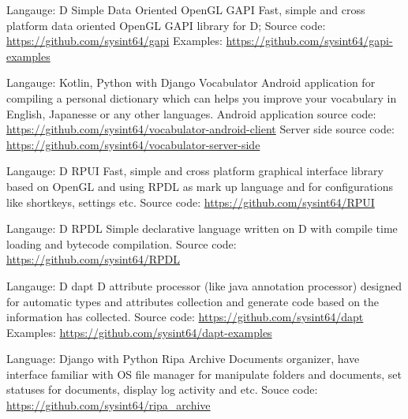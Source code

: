 \begin{cventries}


\cventry
{Langauge: D}
{Simple Data Oriented OpenGL GAPI}
{}
{}
{
Fast, simple and cross platform data oriented OpenGL GAPI library for D;\linebreak
Source code: \url{https://github.com/sysint64/gapi}\linebreak
Examples: \url{https://github.com/sysint64/gapi-examples}\linebreak
}

\cventry
{Langauge: Kotlin, Python with Django}
{Vocabulator}
{}
{}
{
Android application for compiling a personal dictionary which can helps you improve your vocabulary in English, Japanesse or any other languages.\linebreak
Android application source code: \url{https://github.com/sysint64/vocabulator-android-client}\linebreak
Server side source code: \url{https://github.com/sysint64/vocabulator-server-side}\linebreak
}

\cventry
{Langauge: D}
{RPUI}
{}
{}
{
Fast, simple and cross platform graphical interface library based on OpenGL and using RPDL as mark up language
and for configurations like shortkeys, settings etc.\linebreak
Source code: \url{https://github.com/sysint64/RPUI}
}

\cventry
{Langauge: D}
{RPDL}
{}
{}
{
Simple declarative language written on D with compile time loading and bytecode compilation.\linebreak
Source code: \url{https://github.com/sysint64/RPDL}
}

\cventry
{Langauge: D}
{dapt}
{}
{}
{
D attribute processor (like java annotation processor) designed for automatic types and attributes collection and generate
code based on the information has collected.\linebreak
Source code: \url{https://github.com/sysint64/dapt}\linebreak
Examples: \url{https://github.com/sysint64/dapt-examples}
}

\cventry
{Language: Django with Python}
{Ripa Archive}
{}
{}
{
Documents organizer, have interface familiar with OS file manager for manipulate folders and documents, set statuses
for documents, display log activity and etc.\linebreak
Souce code: \url{https://github.com/sysint64/ripa_archive}
}


\end{cventries}
